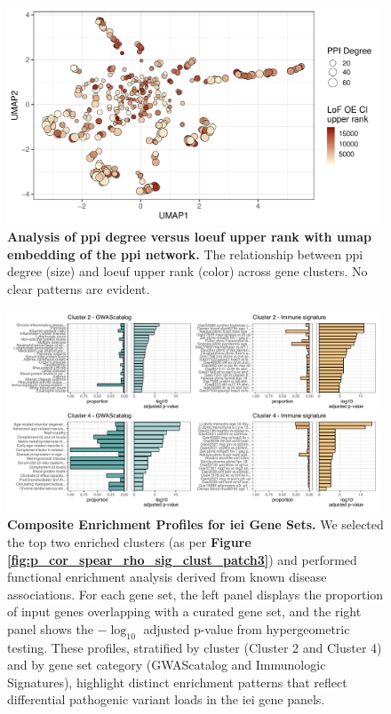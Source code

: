 \begin{figure}[ht]
  \centering
  \includegraphics[width=0.99\textwidth]{../images/untangleR_ppi_network_p_umap_const.pdf}
  \caption{
   \textbf{Analysis of \ac{ppi} degree versus \ac{loeuf} upper rank with \ac{umap} embedding of the \ac{ppi} network.}
    The relationship between \ac{ppi} degree (size) and \ac{loeuf} upper rank (color) across gene clusters. No clear patterns are evident.
  }
  \label{fig:p_umap_const}
\end{figure}

\begin{figure}[ht]
\centering
\includegraphics[width=0.99\textwidth]{../images/fuma_merge.pdf}
\caption{\textbf{Composite Enrichment Profiles for \ac{iei} Gene Sets.} 
We selected the top two enriched clusters (as per \textbf{Figure \ref{fig:p_cor_spear_rho_sig_clust_patch3}}) and performed functional enrichment analysis derived from known disease associations. For each gene set, the left panel displays the proportion of input genes overlapping with a curated gene set, and the right panel shows the \(-\log_{10}\) adjusted p-value from hypergeometric testing. These profiles, stratified by cluster (Cluster 2 and Cluster 4) and by gene set category (GWAScatalog and Immunologic Signatures), highlight distinct enrichment patterns that reflect differential pathogenic variant loads in the \ac{iei} gene panels.}
\label{fig:fuma_merge}
\end{figure}


